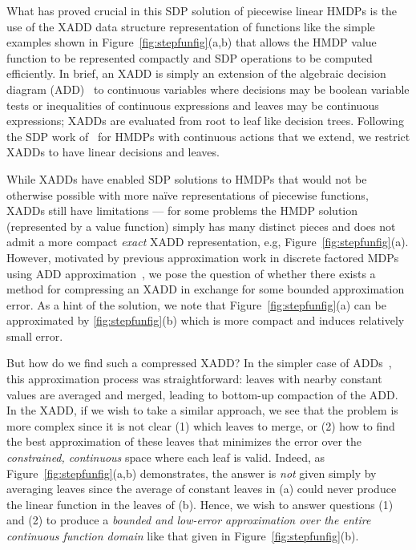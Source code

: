 What has proved crucial in this SDP solution of piecewise linear HMDPs
is the use of the XADD data structure representation of functions like
the simple examples shown in Figure~\ref{fig:stepfunfig}(a,b) that
allows the HMDP value function to be represented compactly and SDP
operations to be computed efficiently.  In brief, an XADD is simply an
extension of the algebraic decision diagram (ADD)~\cite{bahar93add} to
continuous variables where decisions may be boolean variable tests or
inequalities of continuous expressions and leaves may be continuous
expressions; XADDs are evaluated from root to leaf like decision
trees.  Following the SDP work of~\cite{zamani12} for HMDPs with
continuous actions that we extend, we restrict XADDs to have linear
decisions and leaves.

While XADDs have enabled SDP solutions to HMDPs that would not be
otherwise possible with more na\"{i}ve representations of piecewise
functions, XADDs still have limitations --- for some problems the HMDP
solution (represented by a value function) simply has many distinct
pieces and does not admit a more compact \emph{exact} XADD
representation, e.g, Figure~\ref{fig:stepfunfig}(a).  However,
motivated by previous approximation work in discrete factored MDPs
using ADD approximation~\cite{apricodd}, we pose the question of
whether there exists a method for compressing an XADD in exchange
for some bounded approximation error.  As a hint of the solution, we
note that Figure~\ref{fig:stepfunfig}(a) can be approximated
by \ref{fig:stepfunfig}(b) which is more compact and induces relatively 
small error.  

But how do we find such a compressed XADD?  In the simpler case of
ADDs~\cite{apricodd}, this approximation process was straightforward:
leaves with nearby constant values are averaged and merged, leading to
bottom-up compaction of the ADD.  In the XADD, if we wish to take a
similar approach, we see that the problem is more complex since it is
not clear (1) which leaves to merge, or (2) how to find the best
approximation of these leaves that minimizes the error over the
\emph{constrained, continuous} space where each leaf is valid.  Indeed, as
Figure~\ref{fig:stepfunfig}(a,b) demonstrates, the answer
is \emph{not} given simply by averaging leaves since the average of
constant leaves in (a) could never produce the linear function in the
leaves of (b).  Hence, we wish to answer questions (1) and (2) to
produce a \emph{bounded and low-error approximation over the entire
continuous function domain} like that given in
Figure~\ref{fig:stepfunfig}(b).

